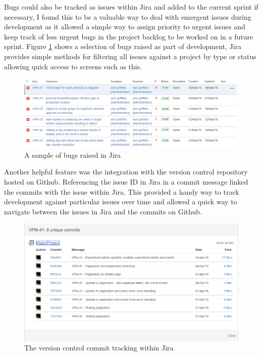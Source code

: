  Bugs could also be tracked as issues within Jira and added to the current sprint if necessary, I found this to be a valuable way to deal with emergent issues during development as it allowed a simple way to assign priority to urgent issues and keep track of less urgent bugs in the project backlog to be worked on in a future sprint. Figure \ref{fig:jira_bugs} shows a selection of bugs raised as part of development, Jira provides simple methods for filtering all issues against a project by type or status allowing quick access to screens such as this.

\begin{figure}[H]
    \centering
    \includegraphics[width=\textwidth]{images/tools/jira_bugs}
    \caption{A sample of bugs raised in Jira}
    \label{fig:jira_bugs}
\end{figure} 

Another helpful feature was the integration with the version control repository hosted on Github. Referencing the issue ID in Jira in a commit message linked the commits with the issue within Jira. This provided a handy way to track development against particular issues over time and allowed a quick way to navigate between the issues in Jira and the commits on Github. 

\begin{figure}[H]
    \centering
    \includegraphics[width=\textwidth]{images/tools/jira_commit}
    \caption{The version control commit tracking within Jira}
    \label{fig:jira_commit}
\end{figure} 

